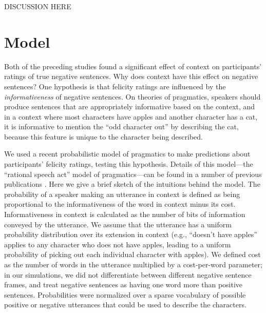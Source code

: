 \documentclass[10pt,letterpaper]{article}
\begin{document}
DISCUSSION HERE


\section{Model}

Both of the preceding studies found a significant effect of context on participants' ratings of true negative sentences.  Why does context have this effect on negative sentences?  One hypothesis is that felicity ratings are influenced by the \emph{informativeness} of negative sentences. On theories of pragmatics, speakers should produce sentences that are appropriately informative based on the context, and in a context where most characters have apples and another character has a cat, it is informative to mention the ``odd character out'' by describing the cat, because this feature is unique to the character being described.




We used a recent probabilistic model of pragmatics to make predictions about participants' felicity ratings, testing this hypothesis. Details of this model---the ``rational speech act'' model of pragmatics---can be found in a number of previous publications \cite{frank2012,goodman2013,nordmeyer2014a}. Here we give a brief sketch of the intuitions behind the model. The probability of a speaker making an utterance in context is defined as being  proportional to the informativeness of the word in context minus its cost.  Informativeness in context is calculated as the number of bits of information conveyed by the utterance.  We assume that the utterance has a uniform probability distribution over its extension in context (e.g., ``doesn't have apples'' applies to any character who does not have apples, leading to a uniform probability of picking out each individual character with apples). We defined cost as the number of words in the utterance multiplied by a cost-per-word parameter; in our simulations, we did not differentiate between different negative sentence frames, and treat negative sentences as having one word more than positive sentences.  Probabilities were normalized over a sparse vocabulary of possible positive or negative utterances that could be used to describe the characters.
\end{document}
